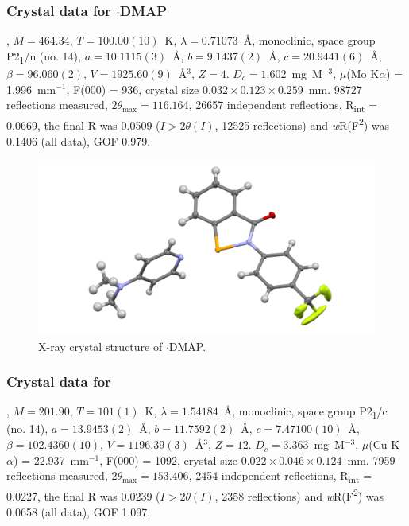 \begin{refsection}
\subsubsection{Crystal data for \texorpdfstring{$ \cdot $DMAP}{C21 H18 F3 N3 O Se}}
, $M=464.34$, $T=100.00(10)$~K, $ \lambda=0.71073 $~\AA, monoclinic, space group P2\textsubscript{1}/n (no. 14), $a = 10.1115(3)$~\AA, $b = 9.1437(2)$~\AA, $c = 20.9441(6)$~\AA, $\beta = 96.060(2)$\degree, $V = 1925.60(9)$~\AA$^{3}$, $Z = 4$. $D_{c}= 1.602$~mg~M$^{-3}$, $\mu$(Mo K$\alpha$) = 1.996~mm$^{-1}$, F(000) = 936, crystal size $0.032 \times 0.123 \times 0.259$~mm. 98727 reflections measured, $2\theta_{\max}=116.164$\degree, 26657 independent reflections, R\textsubscript{int} = 0.0669, the final R was 0.0509 ($I > 2\theta(I)$, 12525 reflections) and \textit{w}R(F\textsuperscript{2}) was 0.1406 (all data), GOF 0.979.

\begin{figure}
  \includegraphics[width=0.6\linewidth]{Figures/ebs-4cf3-dmap-xtal.pdf}
  \caption{X-ray crystal structure of \texorpdfstring{$ \cdot $DMAP}{C21 H18 F3 N3 O Se}.}
\end{figure}

\subsubsection{Crystal data for \texorpdfstring{}{C13 H8 Br N O Se}}
, $M=201.90$, $T=101(1)$~K, $\lambda=1.54184$~\AA, monoclinic, space group P2\textsubscript{1}/c (no. 14), $a = 13.9453(2)$~\AA, $b = 11.7592(2)$~\AA, $c = 7.47100(10)$~\AA, $\beta = 102.4360(10)$\degree, $V = 1196.39(3)$~\AA$^{3}$, $Z = 12$. $D_{c}= 3.363$~mg~M$^{-3}$, $\mu$(Cu K$\alpha$) = 22.937~mm$^{-1}$, F(000) = 1092, crystal size $0.022 \times 0.046 \times 0.124$~mm. 7959 reflections measured, $2\theta_{\max}=153.406$\degree, 2454 independent reflections, R\textsubscript{int} = 0.0227, the final R was 0.0239 ($I > 2\theta(I)$, 2358 reflections) and \textit{w}R(F\textsuperscript{2}) was 0.0658 (all data), GOF 1.097.


\end{refsection}
